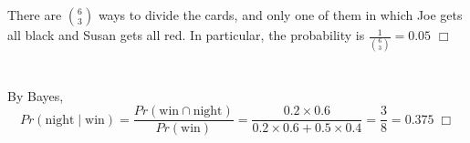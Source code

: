 \documentclass{article}
\begin{document}
\section{}
There are $\binom{6}{3}$ ways to divide the cards, and only one of them in which Joe gets all black and Susan gets all red. In particular, the probability is $\tfrac{1}{\binom{6}{3}} = 0.05$ $\Box$

\section{}
By Bayes,
$$Pr(\text{night} \;|\; \text{win}) = \frac{Pr(\text{win} \cap \text{night})}{Pr(\text{win})} = \frac{0.2 \times 0.6}{0.2 \times 0.6 + 0.5 \times 0.4} = \frac{3}{8} = 0.375 \; \Box$$
\end{document}
